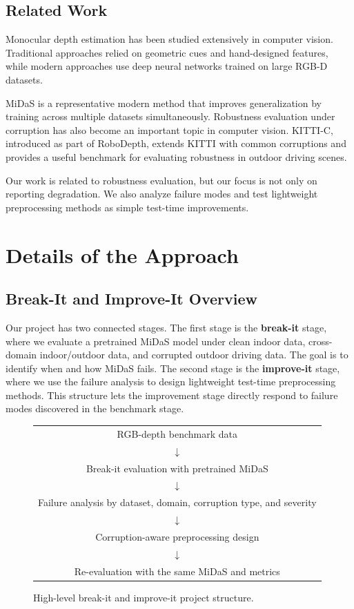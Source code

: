 \documentclass[10pt]{article}
\begin{document}
\subsection*{Related Work}

Monocular depth estimation has been studied extensively in computer vision. Traditional approaches relied on geometric cues and hand-designed features, while modern approaches use deep neural networks trained on large RGB-D datasets.

MiDaS is a representative modern method that improves generalization by training across multiple datasets simultaneously. Robustness evaluation under corruption has also become an important topic in computer vision. KITTI-C, introduced as part of RoboDepth, extends KITTI with common corruptions and provides a useful benchmark for evaluating robustness in outdoor driving scenes.

Our work is related to robustness evaluation, but our focus is not only on reporting degradation. We also analyze failure modes and test lightweight preprocessing methods as simple test-time improvements.

\section{Details of the Approach}

\subsection{Break-It and Improve-It Overview}

Our project has two connected stages. The first stage is the \textbf{break-it} stage, where we evaluate a pretrained MiDaS model under clean indoor data, cross-domain indoor/outdoor data, and corrupted outdoor driving data. The goal is to identify when and how MiDaS fails. The second stage is the \textbf{improve-it} stage, where we use the failure analysis to design lightweight test-time preprocessing methods. This structure lets the improvement stage directly respond to failure modes discovered in the benchmark stage.

\begin{figure}[H]
\centering
\begin{tabular}{c}
RGB-depth benchmark data \\
$\downarrow$ \\
Break-it evaluation with pretrained MiDaS \\
$\downarrow$ \\
Failure analysis by dataset, domain, corruption type, and severity \\
$\downarrow$ \\
Corruption-aware preprocessing design \\
$\downarrow$ \\
Re-evaluation with the same MiDaS and metrics \\
\end{tabular}
\caption{High-level break-it and improve-it project structure.}
\label{fig:break-improve}
\end{figure}
\end{document}
